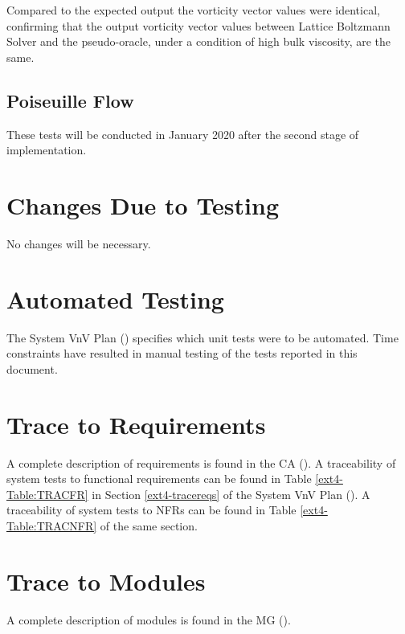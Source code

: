\documentclass[12pt, titlepage]{article}
\newcommand{\myprogname}{Lattice Boltzmann Solver}
\begin{document}
\noindent Compared to the expected output the vorticity vector values were identical, confirming that the output vorticity vector values between {\myprogname} and the pseudo-oracle, under a condition of high bulk viscosity, are the same.\\

\subsection{Poiseuille Flow}
These tests will be conducted in January 2020 after the second stage of implementation.

\section{Changes Due to Testing}
No changes will be necessary.

\section{Automated Testing}

The System VnV Plan (\citet{LBM_SVNV_PM}) specifies which unit tests were to be automated. Time constraints have resulted in manual testing of the tests reported in this document.
		
\section{Trace to Requirements}
\label{traceabilitytoreq}

A complete description of requirements is found in the CA (\citet{LBM_CA_PM}). A traceability of system tests to functional requirements can be found in Table \ref{ext4-Table:TRACFR} in Section \ref{ext4-tracereqs} of the System VnV Plan (\citet{LBM_SVNV_PM}). A traceability of system tests to NFRs can be found in Table \ref{ext4-Table:TRACNFR} of the same section.

\newpage

		
\section{Trace to Modules}	
\label{modulecoverage}

A complete description of modules is found in the MG (\citet{LBM_MG_PM}).
\end{document}
